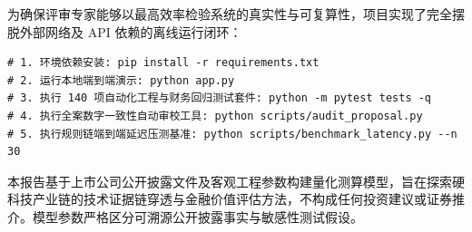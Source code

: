 \documentclass[11pt,a4paper]{ctexart}
\begin{document}
为确保评审专家能够以最高效率检验系统的真实性与可复算性，项目实现了完全摆脱外部网络及 API 依赖的离线运行闭环：
{\small
\begin{verbatim}
# 1. 环境依赖安装: pip install -r requirements.txt
# 2. 运行本地端到端演示: python app.py
# 3. 执行 140 项自动化工程与财务回归测试套件: python -m pytest tests -q
# 4. 执行全案数字一致性自动审校工具: python scripts/audit_proposal.py
# 5. 执行规则链端到端延迟压测基准: python scripts/benchmark_latency.py --n 30
\end{verbatim}
}

\vspace{0.4em}
\begin{warnbox}[研究声明与边界说明]
本报告基于上市公司公开披露文件及客观工程参数构建量化测算模型，旨在探索硬科技产业链的技术证据链穿透与金融价值评估方法，不构成任何投资建议或证券推介。模型参数严格区分可溯源公开披露事实与敏感性测试假设。
\end{warnbox}
\end{document}

